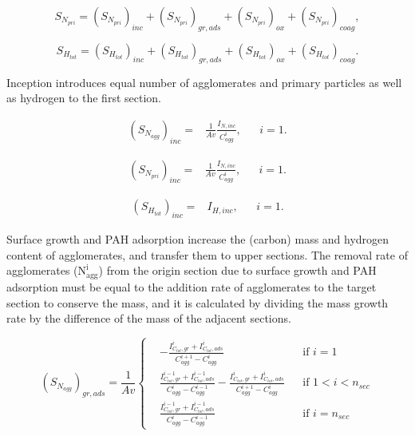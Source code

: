 \begin{equation}
	S_{N_{pri}} = 
	\left(S_{N_{pri}}\right)_{inc}
	+\left(S_{N_{pri}}\right)_{gr, ads}
	+\left(S_{N_{pri}}\right)_{ox}
	+\left(S_{N_{pri}}\right)_{coag}
	\label{eqn:S_Nprisect},
\end{equation}

\begin{equation}
	S_{H_{tot}} = 
	\left(S_{H_{tot}}\right)_{inc}
	+\left(S_{H_{tot}}\right)_{gr, ads}
	+\left(S_{H_{tot}}\right)_{ox}
	+\left(S_{H_{tot}}\right)_{coag}
	\label{eqn:S_Htotsect}.
\end{equation}

Inception introduces equal number of agglomerates and primary particles as well as hydrogen to the first section.

\begin{equation}
	\begin{aligned}
	\left(S_{N_{agg}}\right)_{inc} =
	&\frac{1}{Av}\frac{I_{N, inc}}{C^i_{agg}}, && i=1.
	\end{aligned}
	\label{eqn:S_Nagg_incsect}
\end{equation}

\begin{equation}
	\begin{aligned}
	\left(S_{N_{pri}}\right)_{inc} =
	&\frac{1}{Av}\frac{I_{N, inc}}{C^i_{agg}}, && i=1.
	\end{aligned}
	\label{eqn:S_Npri_incsect}
\end{equation}

\begin{equation}
	\begin{aligned}
		\left(S_{H_{tot}}\right)_{inc} =
		&I_{H, inc}, && i=1.
	\end{aligned}
	\label{eqn:S_Htot_incsect}
\end{equation}

Surface growth and PAH adsorption increase the (carbon) mass and hydrogen content of agglomerates, and transfer them to upper sections. The removal rate of agglomerates ($\mathrm{N^i_{agg}}$) from the origin section due to surface growth and PAH adsorption must be equal to the addition rate of agglomerates to the target section to conserve the mass, and it is calculated by dividing the mass growth rate by the difference of the mass of the adjacent sections.

\begin{equation}
	\left(S_{N_{agg}}\right)_{gr, ads}=
	\frac{1}{Av}
	\left\{
	\begin{aligned}
		&-\frac{I^i_{C_{tot},gr}+I^i_{C_{tot},ads}}{C^{i+1}_{agg}-C^{i}_{agg}}
		&&
		\text{if } i = 1
		\\
		&\frac{I^{i-1}_{C_{tot},gr}+I^{i-1}_{C_{tot},ads}}{C^{i}_{agg}-C^{i-1}_{agg}}
		-\frac{I^{i}_{C_{tot},gr}+I^{i}_{C_{tot},ads}}{C^{i+1}_{agg}-C^{i}_{agg}}
		&&
		\text{if } 1 < i < n_{sec}
		\\
		&\frac{I^{i-1}_{C_{tot},gr}+I^{i-1}_{C_{tot},ads}}{C^{i}_{agg}-C^{i-1}_{agg}}
		&&\text{if } i=n_{sec}
	\end{aligned}
	\right.
	\label{eqn:S_Nagg_gradssect}
\end{equation}

